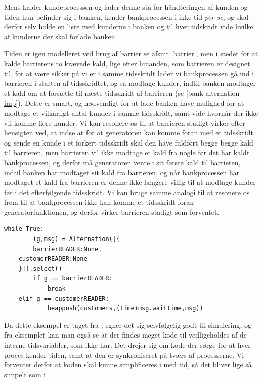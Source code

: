 Mens \simpy kalder kundeprocessen og lader denne stå for håndteringen af 
kunden og tiden hun befinder sig i banken, kender bankprocessen i \pycsp ikke 
tid \emph{per se}, og skal derfor selv holde en liste med kunderne 
i banken og til hver tidskridt vide hvilke af kunderne der skal forlade 
banken. 

Tiden er igen modelleret ved brug af barrier se afsnit \cref{barrier}, men 
i stedet for at kalde barrierens to krævede kald, lige efter hinanden, som barrieren er designet til, for at være sikker på vi er i samme tidsskridt lader vi bankprocessen gå ind i barrieren i starten af tidsskridtet, og så modtage kunder, 
indtil banken modtager et kald om at forsætte til næste tidsskridt af 
barrieren (se \cref{bank-alternation-imp}). Dette er smart, og nødvendigt for at lade banken have mulighed for at modtage 
et vilkårligt antal kunder i samme tidsskridt, samt vide hvornår der ikke vil  
komme flere kunder. Vi kan resonere os til at barrieren stadigt virker efter 
hensigten ved, at indse at for at generatoren kan komme foran med et tidsskridt og sende en 
kunde i et forkert tidsskridt skal den have fuldført begge begge kald til barrieren, men 
barrieren vil ikke modtage et kald fra nogle før det har kaldt bankprocessen, 
og derfor må generatoren vente i sit første kald til barrieren, indtil banken har 
modtaget sit kald fra barrieren, og når bankprocessen har modtaget et kald fra barrieren er denne ikke længere villig til at modtage kunder før i det efterfølgende tidsskridt. Vi kan bruge samme analogi til at resonere os frem til at bankprocessen ikke kan komme et tidsskridt foran generatorfunktionen, og derfor virker barrieren stadigt som forventet. 

\begin{lstlisting}[float=hbtp,label=bank-alternation-imp,caption=Modtage en kunde eller 
	barrier i Bankprocessen]
while True:
		(g,msg) = Alternation([{
		barrierREADER:None,
    customerREADER:None
    }]).select()
		if g == barrierREADER:
			break
    elif g == customerREADER:
			heappush(customers,(time+msg.waittime,msg))
\end{lstlisting}

Da dette eksempel er taget fra \simpy, egner det sig selvfølgelig godt til simulering, og fra eksemplet kan man også se at der findes meget kode til vedligeholdes af de interne tidsvariabler, som \simpy ikke har. Det drejer sig om kode der sørge for at hver proces kender tiden, samt at den er synkroniseret på tværs af processerne. Vi forventer derfor at koden skal kunne simplificeres i \pycsp med tid, så det bliver lige så simpelt som i \simpy.

